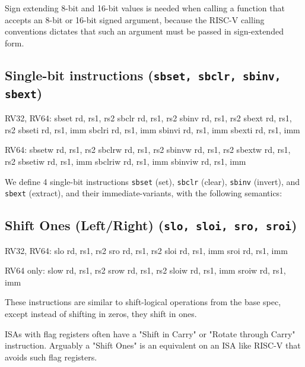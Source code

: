 Sign extending 8-bit and 16-bit values is needed when calling a function that
accepts an 8-bit or 16-bit signed argument, because the RISC-V calling
conventions dictates that such an argument must be passed in sign-extended
form.


\subsection{Single-bit instructions (\texttt{sbset, sbclr, sbinv, sbext})}

\begin{rvb}
  RV32, RV64:
    sbset  rd, rs1, rs2
    sbclr  rd, rs1, rs2
    sbinv  rd, rs1, rs2
    sbext  rd, rs1, rs2
    sbseti rd, rs1, imm
    sbclri rd, rs1, imm
    sbinvi rd, rs1, imm
    sbexti rd, rs1, imm

  RV64:
    sbsetw  rd, rs1, rs2
    sbclrw  rd, rs1, rs2
    sbinvw  rd, rs1, rs2
    sbextw  rd, rs1, rs2
    sbsetiw rd, rs1, imm
    sbclriw rd, rs1, imm
    sbinviw rd, rs1, imm
\end{rvb}

We define 4 single-bit instructions \texttt{sbset} (set), \texttt{sbclr} (clear),
\texttt{sbinv} (invert), and \texttt{sbext} (extract), and their immediate-variants,
with the following semantics:




\subsection{Shift Ones (Left/Right) (\texttt{slo,\ sloi,\ sro,\ sroi})}

\begin{rvb}
  RV32, RV64:
    slo  rd, rs1, rs2
    sro  rd, rs1, rs2
    sloi rd, rs1, imm
    sroi rd, rs1, imm

  RV64 only:
    slow  rd, rs1, rs2
    srow  rd, rs1, rs2
    sloiw rd, rs1, imm
    sroiw rd, rs1, imm
\end{rvb}

These instructions are similar to shift-logical operations from the base
spec, except instead of shifting in zeros, they shift in ones.



ISAs with flag registers often have a "Shift in Carry" or "Rotate through Carry" instruction.
Arguably a "Shift Ones" is an equivalent on an ISA like RISC-V that avoids such flag registers.

